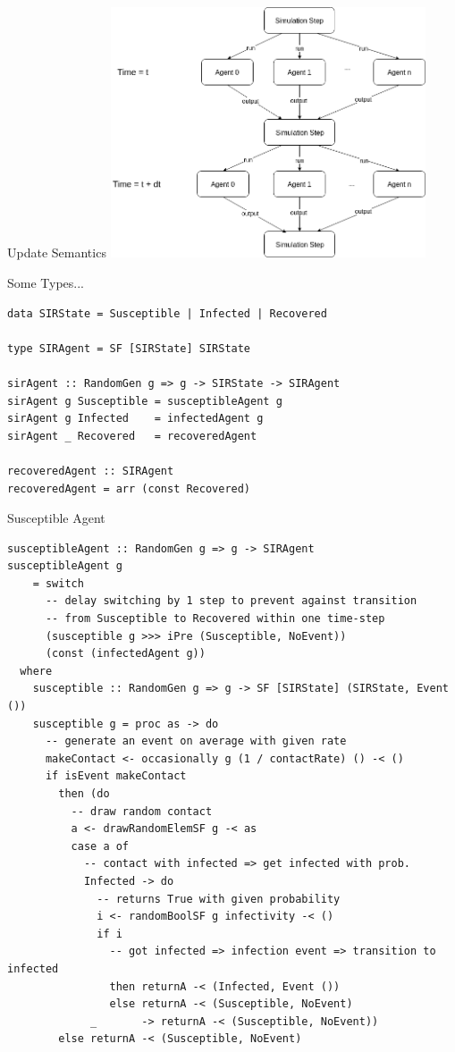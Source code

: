 \documentclass{beamer}
\begin{document}
\begin{frame}{Update Semantics}
\hspace*{1cm}\includegraphics[width=0.7\textwidth]{./fig/parallel_strategy.png}\hspace*{-1cm}
\end{frame}

\begin{frame}[fragile]{Some Types...}
\begin{verbatim}
data SIRState = Susceptible | Infected | Recovered

type SIRAgent = SF [SIRState] SIRState 
  
sirAgent :: RandomGen g => g -> SIRState -> SIRAgent
sirAgent g Susceptible = susceptibleAgent g
sirAgent g Infected    = infectedAgent g
sirAgent _ Recovered   = recoveredAgent

recoveredAgent :: SIRAgent
recoveredAgent = arr (const Recovered)
\end{verbatim}
\end{frame}

\begin{frame}[fragile]{Susceptible Agent}
\begin{verbatim}
susceptibleAgent :: RandomGen g => g -> SIRAgent
susceptibleAgent g 
    = switch 
      -- delay switching by 1 step to prevent against transition
      -- from Susceptible to Recovered within one time-step
      (susceptible g >>> iPre (Susceptible, NoEvent)) 
      (const (infectedAgent g))
  where
    susceptible :: RandomGen g => g -> SF [SIRState] (SIRState, Event ())
    susceptible g = proc as -> do
      -- generate an event on average with given rate
      makeContact <- occasionally g (1 / contactRate) () -< ()
      if isEvent makeContact
        then (do
          -- draw random contact
          a <- drawRandomElemSF g -< as
          case a of
            -- contact with infected => get infected with prob.
            Infected -> do
              -- returns True with given probability
              i <- randomBoolSF g infectivity -< ()
              if i
                -- got infected => infection event => transition to infected
                then returnA -< (Infected, Event ())
                else returnA -< (Susceptible, NoEvent)
             _       -> returnA -< (Susceptible, NoEvent))
        else returnA -< (Susceptible, NoEvent)
\end{verbatim}
\end{frame}
\end{document}
